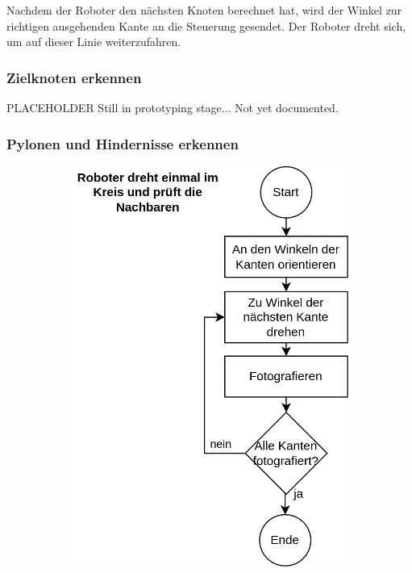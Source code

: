 Nachdem der Roboter den nächsten Knoten berechnet hat, wird der Winkel zur richtigen ausgehenden Kante an die Steuerung gesendet. Der Roboter dreht sich, um auf dieser Linie weiterzufahren.

\subsubsection{Zielknoten erkennen}

PLACEHOLDER Still in prototyping stage... Not yet documented.


\subsubsection{Pylonen und Hindernisse erkennen}

\begin{figure}[H]
\begin{subfigure}{0.45\textwidth}
\includegraphics[width=\textwidth]{assets/gesamtkonzept/ablaufdiagramm-hindernisse-erkennen.png}

\end{subfigure}
\end{figure}
